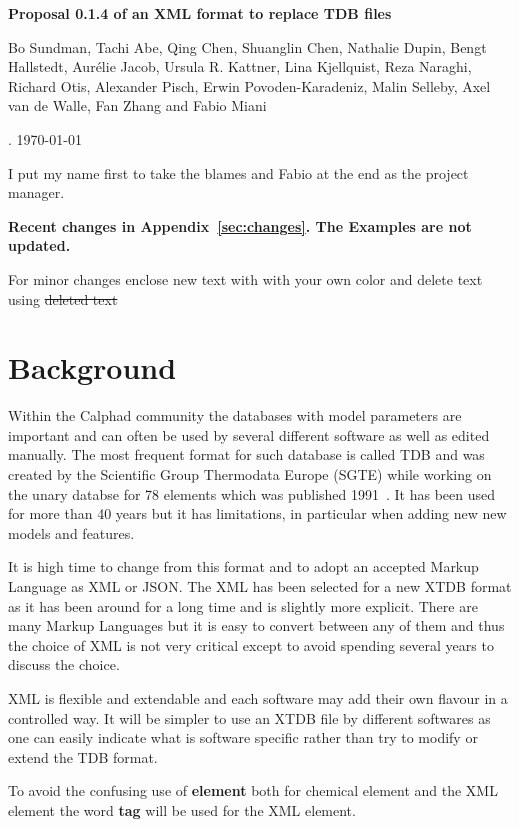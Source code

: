 \documentclass{article}
\begin{document}
\begin{center}

  {\Large \bf Proposal 0.1.4 of an XML format to replace TDB files}


  Bo Sundman, Tachi Abe, Qing Chen, Shuanglin Chen, Nathalie Dupin,
  Bengt Hallstedt, Aur{\'e}lie Jacob, Ursula R. Kattner, Lina Kjellquist,
  Reza Naraghi, Richard Otis, Alexander Pisch, Erwin
  Povoden-Karadeniz, Malin Selleby, Axel van de Walle, Fan Zhang and
  Fabio Miani


. \today

\end{center}

I put my name first to take the blames and Fabio at the end as the
project manager.

{\bf Recent changes in Appendix~\ref{sec:changes}.  The Examples are
  not updated.}

For minor changes enclose new text with {\color{green} with your own
  color} and delete text using \sout{deleted text}

\section{Background}

Within the Calphad community the databases with model parameters are
important and can often be used by several different software as well
as edited manually.  The most frequent format for such database is
called TDB and was created by the Scientific Group Thermodata Europe
(SGTE) while working on the unary databse for 78 elements which was
published 1991~\cite{91Din}.  It has been used for more than 40 years
but it has limitations, in particular when adding new new models and
features.

It is high time to change from this format and to adopt an accepted
Markup Language as XML or JSON.  The XML has been selected for a new
XTDB format as it has been around for a long time and is slightly more
explicit.  There are many Markup Languages but it is easy to convert
between any of them and thus the choice of XML is not very critical
except to avoid spending several years to discuss the choice.

XML is flexible and extendable and each software may add their own
flavour in a controlled way.  It will be simpler to use an XTDB file
by different softwares as one can easily indicate what is software
specific rather than try to modify or extend the TDB format.

To avoid the confusing use of {\bf element} both for chemical element
and the XML element the word {\bf tag} will be used for the XML
element.
\end{document}
